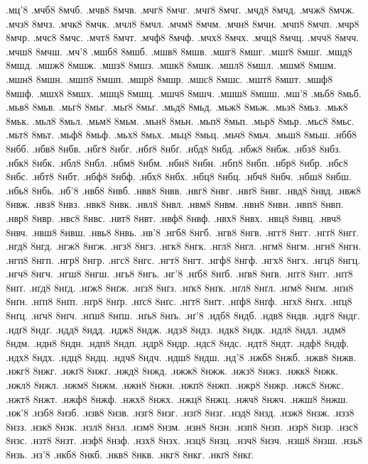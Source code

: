 {.мц'8
.мчб8 8мчб.
.мчв8 8мчв.
.мчг8 8мчг.
.мчґ8 8мчґ.
.мчд8 8мчд.
.мчж8 8мчж.
.мчз8 8мчз.
.мчк8 8мчк.
.мчл8 8мчл.
.мчм8 8мчм.
.мчн8 8мчн.
.мчп8 8мчп.
.мчр8 8мчр.
.мчс8 8мчс.
.мчт8 8мчт.
.мчф8 8мчф.
.мчх8 8мчх.
.мчц8 8мчц.
.мчч8 8мчч.
.мчш8 8мчш.
.мч'8
.мшб8 8мшб.
.мшв8 8мшв.
.мшг8 8мшг.
.мшґ8 8мшґ.
.мшд8 8мшд.
.мшж8 8мшж.
.мшз8 8мшз.
.мшк8 8мшк.
.мшл8 8мшл.
.мшм8 8мшм.
.мшн8 8мшн.
.мшп8 8мшп.
.мшр8 8мшр.
.мшс8 8мшс.
.мшт8 8мшт.
.мшф8 8мшф.
.мшх8 8мшх.
.мшц8 8мшц.
.мшч8 8мшч.
.мшш8 8мшш.
.мш'8
.мьб8 8мьб.
.мьв8 8мьв.
.мьг8 8мьг.
.мьґ8 8мьґ.
.мьд8 8мьд.
.мьж8 8мьж.
.мьз8 8мьз.
.мьк8 8мьк.
.мьл8 8мьл.
.мьм8 8мьм.
.мьн8 8мьн.
.мьп8 8мьп.
.мьр8 8мьр.
.мьс8 8мьс.
.мьт8 8мьт.
.мьф8 8мьф.
.мьх8 8мьх.
.мьц8 8мьц.
.мьч8 8мьч.
.мьш8 8мьш.
.нбб8 8нбб.
.нбв8 8нбв.
.нбг8 8нбг.
.нбґ8 8нбґ.
.нбд8 8нбд.
.нбж8 8нбж.
.нбз8 8нбз.
.нбк8 8нбк.
.нбл8 8нбл.
.нбм8 8нбм.
.нбн8 8нбн.
.нбп8 8нбп.
.нбр8 8нбр.
.нбс8 8нбс.
.нбт8 8нбт.
.нбф8 8нбф.
.нбх8 8нбх.
.нбц8 8нбц.
.нбч8 8нбч.
.нбш8 8нбш.
.нбь8 8нбь.
.нб'8
.нвб8 8нвб.
.нвв8 8нвв.
.нвг8 8нвг.
.нвґ8 8нвґ.
.нвд8 8нвд.
.нвж8 8нвж.
.нвз8 8нвз.
.нвк8 8нвк.
.нвл8 8нвл.
.нвм8 8нвм.
.нвн8 8нвн.
.нвп8 8нвп.
.нвр8 8нвр.
.нвс8 8нвс.
.нвт8 8нвт.
.нвф8 8нвф.
.нвх8 8нвх.
.нвц8 8нвц.
.нвч8 8нвч.
.нвш8 8нвш.
.нвь8 8нвь.
.нв'8
.нгб8 8нгб.
.нгв8 8нгв.
.нгг8 8нгг.
.нгґ8 8нгґ.
.нгд8 8нгд.
.нгж8 8нгж.
.нгз8 8нгз.
.нгк8 8нгк.
.нгл8 8нгл.
.нгм8 8нгм.
.нгн8 8нгн.
.нгп8 8нгп.
.нгр8 8нгр.
.нгс8 8нгс.
.нгт8 8нгт.
.нгф8 8нгф.
.нгх8 8нгх.
.нгц8 8нгц.
.нгч8 8нгч.
.нгш8 8нгш.
.нгь8 8нгь.
.нг'8
.нґб8 8нґб.
.нґв8 8нґв.
.нґг8 8нґг.
.нґґ8 8нґґ.
.нґд8 8нґд.
.нґж8 8нґж.
.нґз8 8нґз.
.нґк8 8нґк.
.нґл8 8нґл.
.нґм8 8нґм.
.нґн8 8нґн.
.нґп8 8нґп.
.нґр8 8нґр.
.нґс8 8нґс.
.нґт8 8нґт.
.нґф8 8нґф.
.нґх8 8нґх.
.нґц8 8нґц.
.нґч8 8нґч.
.нґш8 8нґш.
.нґь8 8нґь.
.нґ'8
.ндб8 8ндб.
.ндв8 8ндв.
.ндг8 8ндг.
.ндґ8 8ндґ.
.ндд8 8ндд.
.ндж8 8ндж.
.ндз8 8ндз.
.ндк8 8ндк.
.ндл8 8ндл.
.ндм8 8ндм.
.ндн8 8ндн.
.ндп8 8ндп.
.ндр8 8ндр.
.ндс8 8ндс.
.ндт8 8ндт.
.ндф8 8ндф.
.ндх8 8ндх.
.ндц8 8ндц.
.ндч8 8ндч.
.ндш8 8ндш.
.нд'8
.нжб8 8нжб.
.нжв8 8нжв.
.нжг8 8нжг.
.нжґ8 8нжґ.
.нжд8 8нжд.
.нжж8 8нжж.
.нжз8 8нжз.
.нжк8 8нжк.
.нжл8 8нжл.
.нжм8 8нжм.
.нжн8 8нжн.
.нжп8 8нжп.
.нжр8 8нжр.
.нжс8 8нжс.
.нжт8 8нжт.
.нжф8 8нжф.
.нжх8 8нжх.
.нжц8 8нжц.
.нжч8 8нжч.
.нжш8 8нжш.
.нж'8
.нзб8 8нзб.
.нзв8 8нзв.
.нзг8 8нзг.
.нзґ8 8нзґ.
.нзд8 8нзд.
.нзж8 8нзж.
.нзз8 8нзз.
.нзк8 8нзк.
.нзл8 8нзл.
.нзм8 8нзм.
.нзн8 8нзн.
.нзп8 8нзп.
.нзр8 8нзр.
.нзс8 8нзс.
.нзт8 8нзт.
.нзф8 8нзф.
.нзх8 8нзх.
.нзц8 8нзц.
.нзч8 8нзч.
.нзш8 8нзш.
.нзь8 8нзь.
.нз'8
.нкб8 8нкб.
.нкв8 8нкв.
.нкг8 8нкг.
.нкґ8 8нкґ.
}

